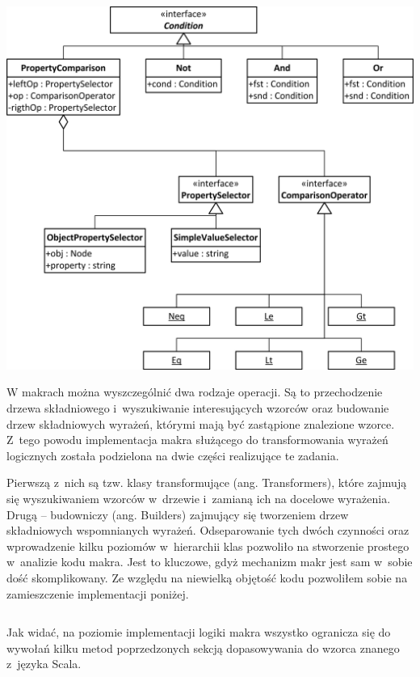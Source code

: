 \documentclass[brudnopis]{xmgr}
\begin{document}
\begin{center}
	\includegraphics[scale=1]{images/conditions-uml.png}
\end{center}

W makrach można wyszczególnić dwa rodzaje operacji. Są to przechodzenie drzewa składniowego i~wyszukiwanie interesujących wzorców oraz budowanie drzew składniowych wyrażeń, którymi mają być zastąpione znalezione wzorce. Z~tego powodu implementacja makra służącego do transformowania wyrażeń logicznych została podzielona na dwie części realizujące te zadania.

Pierwszą z~nich są tzw. klasy transformujące (ang. Transformers), które zajmują się wyszukiwaniem wzorców w~drzewie i~zamianą ich na docelowe wyrażenia. Drugą -- budowniczy (ang. Builders) zajmujący się tworzeniem drzew składniowych wspomnianych wyrażeń. Odseparowanie tych dwóch czynności oraz wprowadzenie kilku poziomów w~hierarchii klas pozwoliło na stworzenie prostego w~analizie kodu makra. Jest to kluczowe, gdyż mechanizm makr jest sam w~sobie dość skomplikowany.  Ze względu na niewielką objętość kodu pozwoliłem sobie na zamieszczenie implementacji poniżej.

\inputminted{scala}{listings/scala/boolean-macro-implementation.scala}

Jak widać, na poziomie implementacji logiki makra wszystko ogranicza się do wywołań kilku metod poprzedzonych sekcją dopasowywania do wzorca znanego z~języka Scala.
\end{document}
